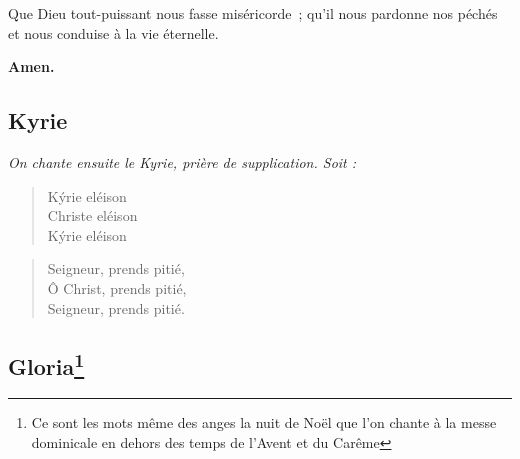 Que Dieu tout-puissant
nous fasse miséricorde~;
qu'il nous pardonne nos péchés
et nous conduise à la vie éternelle.

{\bf Amen.}



\subsection*{Kyrie}
\emph{On chante ensuite le Kyrie, prière de supplication. Soit :}

{\bf
\begin{minipage}[t]{0.5\textwidth}
\begin{verse}
K\'yrie eléison \\
Christe eléison \\
K\'yrie eléison  \\
\end{verse}
\end{minipage}
\begin{minipage}[t]{0.5\textwidth}
\begin{verse}
Seigneur, prends pitié, \\
Ô Christ, prends pitié, \\
Seigneur, prends pitié. \\
\end{verse}
\end{minipage}
}




\subsection*{Gloria\footnote{Ce sont les mots même des anges la nuit de Noël que 
l'on chante à la messe dominicale en dehors des temps de l'Avent et du Carême}}


